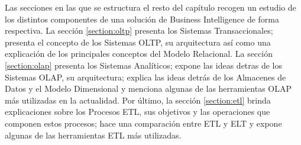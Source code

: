 Las secciones en las que se estructura el resto del cap\'itulo recogen un estudio de los distintos componentes de una 
soluci\'on de Business Intelligence de forma respectiva. La secci\'on \ref{section:oltp} presenta los Sistemas 
Transaccionales; presenta el concepto de los Sistemas OLTP, su arquitectura as\'i como una explicaci\'on de los principales 
conceptos del Modelo Relacional. La secci\'on \ref{section:olap} presenta los Sistemas Anal\'iticos; 
expone las ideas detras de los Sistemas OLAP, su arquitectura; explica las ideas detr\'as de los Almacenes de Datos y el 
Modelo Dimensional y menciona algunas de las herramientas OLAP m\'as utilizadas en la actualidad. Por \'ultimo, la 
secci\'on \ref{section:etl} brinda explicaciones sobre los Procesos ETL, sus objetivos y las operaciones que componen 
estos procesos; hace una comparaci\'on entre ETL y ELT y expone algunas de las herramientas ETL m\'as utilizadas.







